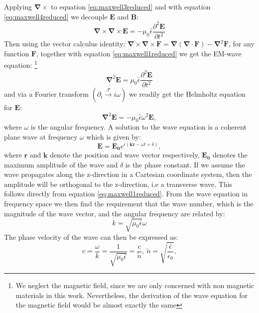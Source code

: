 Applying $\bm{\nabla}\times$ to equation \ref{eq:maxwell3reduced} and with equation \ref{eq:maxwell4reduced} we decouple $\bm{E}$ and $\bm{B}$: 
\begin{equation}
    \bm{\nabla}\times \bm{\nabla}\times \bm{E} = -\mu_0 \hat{\epsilon} \frac{\partial^2\bm{E}}{\partial t^2}
\end{equation}
Then using the vector calculus identity: $\bm{\nabla}\times \bm{\nabla}\times \bm{F} = \bm{\nabla} \left( \bm{\nabla} \cdot \bm{F} \right) - \bm{\nabla}^2 \bm{F}$, for any function $\bm{F}$, together with equation \ref{eq:maxwell1reduced} we get the EM-wave equation: \footnote{We neglect the magnetic field, since we are only concerned with non magnetic materials in this work. Nevertheless, the derivation of the wave equation for the magnetic field would be almost exactly the same}
\begin{equation}
    \label{eq:waveeq}
    \bm{\nabla}^2 \bm{E} = \mu_0 \hat{\epsilon} \frac{\partial^2\bm{E}}{\partial t^2}
\end{equation}
and via a Fourier transform $(\partial_t \xrightarrow{\mathscr{F}} i\omega)$ we readily get the Helmholtz equation for $\bm{E}$:
\begin{equation}
    \label{eq:waveeqfreq}
    \bm{\nabla}^2 \bm{E} = -\mu_0 \hat{\epsilon} \omega^2 \bm{E},
\end{equation}
where $\omega$ is the angular frequency.
A solution to the wave equation is a coherent plane wave at frequency $\omega$ which is given by: 
\begin{equation}
    \label{eq:planewave}
    \bm{E} = \bm{E_0} e^{i(\bm{k}\bm{r} - \omega t + \delta)},
\end{equation}
where $\bm{r}$ and $\bm{k}$ denote the position and wave vector respectively, $\bm{E_0}$ denotes the maximum amplitude of the wave and $\delta$ is the phase constant. If we assume the wave propagates along the z-direction in a Cartesian coordinate system, then the amplitude will be orthogonal to the z-direction, i.e a transverse wave. This follows directly from equation \ref{eq:maxwell1reduced}. From the wave equation in frequency space we then find the requirement that the wave number, which is the magnitude of the wave vector, and the angular frequency are related by:
\begin{equation}
    \label{eq:wavevector_req}
    k = \sqrt{\mu_0 \hat{\epsilon}} \omega
\end{equation}
The phase velocity of the wave can then be expressed as:
\begin{equation}
    v = \frac{\omega}{k} = \frac{1}{\sqrt{\mu_0 \hat{\epsilon}}} = \frac{c}{\tilde{n}},\:\tilde{n} = \sqrt{\frac{\hat{\epsilon}}{\epsilon_0}},
\end{equation}
